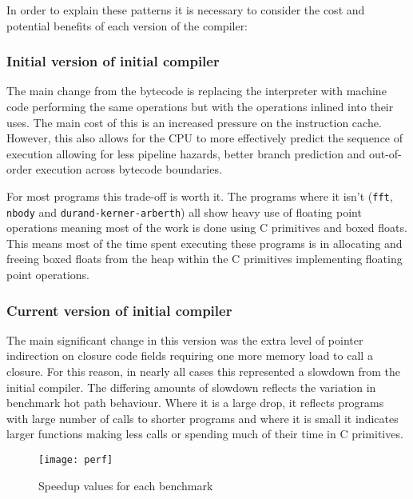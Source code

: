 In order to explain these patterns it is necessary to consider the cost and potential benefits of
each version of the compiler:

\subsubsection{Initial version of initial compiler}

The main change from the bytecode is replacing the interpreter with machine code performing the
same
operations but with the operations inlined into their uses. The main cost of this is an increased
pressure on the instruction cache. However, this also allows for the CPU to more effectively
predict
the sequence of execution allowing for less pipeline hazards, better branch prediction and
out-of-order execution across bytecode boundaries.

For most programs this trade-off is worth it.  The programs where it isn't (\texttt{fft},
\texttt{nbody} and \texttt{durand-kerner-arberth}) all show heavy use of floating point operations
meaning most of the work is done using C primitives and boxed floats. This means most of the time
spent executing these programs is in allocating and freeing boxed floats from the heap within the C
primitives implementing floating point operations.

\subsubsection{Current version of initial compiler}

The main significant change in this version was the extra level of pointer indirection on closure
code fields requiring one more memory load to call a closure. For this reason, in nearly all cases
this represented a slowdown from the initial compiler. The differing amounts of slowdown reflects
the variation in benchmark hot path behaviour. Where it is a large drop, it reflects programs with
large number of calls to shorter programs and where it is small it indicates larger functions
making
less calls or spending much of their time in C primitives.

\begin{landscape}
      \begin{figure}[h]
            \texttt{[image: perf]}
            \caption{Speedup values for each benchmark}
            \label{fig:perf}
      \end{figure}
\end{landscape}

